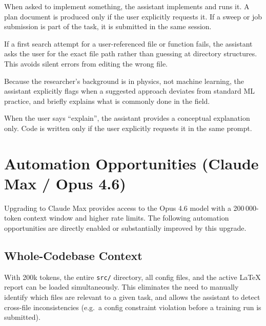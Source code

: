 \documentclass[11pt]{article}
\begin{document}
\begin{description}[leftmargin=1.5em, style=nextline]
  \item[Implement, don't only plan.]
        When asked to implement something, the assistant implements and
        runs it.  A plan document is produced only if the user
        explicitly requests it.  If a sweep or job submission is part
        of the task, it is submitted in the same session.

  \item[Ask for exact paths when searching fails.]
        If a first search attempt for a user-referenced file or
        function fails, the assistant asks the user for the exact file
        path rather than guessing at directory structures.  This avoids
        silent errors from editing the wrong file.

  \item[Flag non-standard ML practices.]
        Because the researcher's background is in physics, not machine
        learning, the assistant explicitly flags when a suggested
        approach deviates from standard ML practice, and briefly
        explains what is commonly done in the field.

  \item[Explain without coding by default.]
        When the user says ``explain'', the assistant provides a
        conceptual explanation only.  Code is written only if the user
        explicitly requests it in the same prompt.
\end{description}

\section{Automation Opportunities (Claude Max / Opus 4.6)}
\label{sec:automation}

Upgrading to Claude Max provides access to the Opus 4.6 model with a
200\,000-token context window and higher rate limits.  The following
automation opportunities are directly enabled or substantially improved
by this upgrade.

\subsection{Whole-Codebase Context}

With 200k tokens, the entire \texttt{src/} directory, all config
files, and the active \LaTeX{} report can be loaded simultaneously.
This eliminates the need to manually identify which files are relevant
to a given task, and allows the assistant to detect cross-file
inconsistencies (e.g.\ a config constraint violation before a training
run is submitted).
\end{document}

